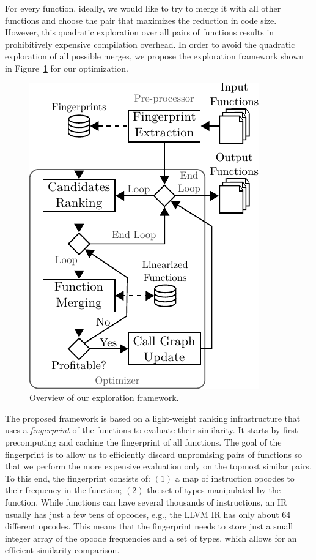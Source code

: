 For every function, ideally, we would like to try to merge it with all other functions and choose the pair that maximizes the reduction in
code size. However, this quadratic exploration over all pairs of functions results in prohibitively expensive compilation
overhead. In order to avoid the quadratic exploration of all possible merges, we propose the exploration framework shown in
Figure~\ref{fig:func-merge-opt-arch} for our optimization.
\begin{figure}[t!]
  \centering
  \includegraphics[width=0.65\linewidth]{figs/func-merge-opt-arch.pdf}
  \caption{Overview of our exploration framework.}
  \label{fig:func-merge-opt-arch}
\end{figure}

The proposed framework is based on a light-weight ranking infrastructure that uses a \textit{fingerprint} of the functions to evaluate
their similarity. It starts by first precomputing and caching the fingerprint of all functions. The goal of the fingerprint is to allow us
to efficiently discard unpromising pairs of functions so that we perform the more expensive evaluation only on the topmost similar pairs.
To this end, the fingerprint consists of: $(1)$ a map of instruction opcodes to their frequency in the function; $(2)$ the set of types
manipulated by the function. While functions can have several thousands of instructions, an IR usually has just a few tens of opcodes,
e.g., the LLVM IR has only about 64 different opcodes. This means that the fingerprint needs to store just a small integer array of the
opcode frequencies and a set of types, which allows for an efficient similarity comparison.

